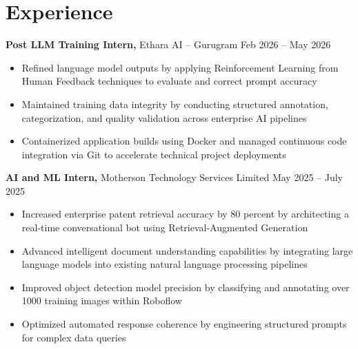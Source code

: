 \section*{Experience}
\textbf{Post LLM Training Intern,} Ethara AI -- Gurugram \hfill Feb 2026 -- May 2026 \\
\vspace{-9pt}
\begin{itemize}
  \item Refined language model outputs by applying Reinforcement Learning from Human Feedback techniques to evaluate and correct prompt accuracy
  \item Maintained training data integrity by conducting structured annotation, categorization, and quality validation across enterprise AI pipelines
  \item Containerized application builds using Docker and managed continuous code integration via Git to accelerate technical project deployments
\end{itemize}

\textbf{AI and ML Intern,} Motherson Technology Services Limited \hfill May 2025 -- July 2025 \\
\vspace{-9pt}
\begin{itemize}
  \item Increased enterprise patent retrieval accuracy by 80 percent by architecting a real-time conversational bot using Retrieval-Augmented Generation
  \item Advanced intelligent document understanding capabilities by integrating large language models into existing natural language processing pipelines
  \item Improved object detection model precision by classifying and annotating over 1000 training images within Roboflow
  \item Optimized automated response coherence by engineering structured prompts for complex data queries
\end{itemize}

\vspace{-18.5pt}